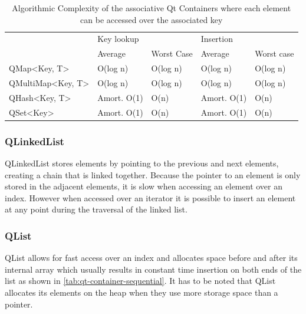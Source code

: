 \begin{table}[!htb]

\centering
\begin{tabular}{@{}|l|l|l|l|l|@{}}
\toprule

\multirow{2}{*}{}                    & \multicolumn{2}{l|}{Key lookup} & \multicolumn{2}{l|}{Insertion} \\ \cmidrule(l){2-5} 
                                     & Average         & Worst Case    & Average        & Worst case    \\ \midrule
QMap\textless Key, T\textgreater      & O(log n)        & O(log n)      & O(log n)       & O(log n)      \\ \midrule
QMultiMap\textless Key, T\textgreater & O(log n)        & O(log n)      & O(log n)       & O(log n)      \\ \midrule
QHash\textless Key, T\textgreater     & Amort. O(1)     & O(n)          & Amort. O(1)    & O(n)          \\ \midrule
QSet\textless Key\textgreater         & Amort. O(1)     & O(n)          & Amort. O(1)    & O(n)          \\ \bottomrule
\end{tabular}
\caption{Algorithmic Complexity of the associative Qt Containers where each element can be accessed over the associated key \cite{QtDoc:Containers}}
\label{tab:qt-container-associative}
\end{table}

\subsubsection{QLinkedList}
\label{sec:QLikedList}
QLinkedList stores elements by pointing to the previous and next elements, creating a chain that is linked together. Because the pointer to an element is only stored in the adjacent elements, it is slow when accessing an element over an index. However when accessed over an iterator it is possible to insert an element at any point during the traversal of the linked list.

\subsubsection{QList}
\label{sec:QList}
QList allows for fast access over an index and allocates space before and after its internal array which usually results in constant time insertion on both ends of the list as shown in \ref{tab:qt-container-sequential}. It has to be noted that QList allocates its elements on the heap when they use more storage space than a pointer.\cite{QtDoc:QList}
